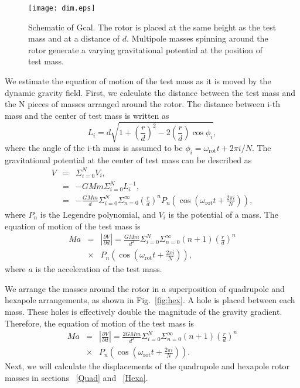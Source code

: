\documentclass[%
 reprint,
superscriptaddress,
 amsmath,amssymb,
 aps,
]{revtex4-1}
\begin{document}
\begin{figure}
\begin{center}
\texttt{[image: dim.eps]}
\caption{Schematic of Gcal. The rotor is placed at  the same height as the test mass and at a distance of $d$. Multipole masses spinning around the rotor generate a varying gravitational potential at the position of test mass.}
\label{fig:dim}
\end{center}
\end{figure}
We estimate the equation of motion of the test mass as it is moved by the dynamic gravity field.
First, we calculate the distance between the test mass and the N pieces of masses arranged around the rotor.
The distance between i-th mass and the center of test mass is written as
\begin{equation}
L_i=d \sqrt{1+\left( \frac{r}{d} \right)^2 -2\left( \frac{r}{d} \right) \cos{\phi_i} },
\end{equation}
where the angle of the i-th mass is assumed to be $\phi_i=\omega_{\mathrm{rot}} t + 2\pi i/N$.
The gravitational potential at the center of test mass can be described as
\begin{eqnarray}
V &=& \Sigma^N_{i=0} V_i, \\
&=& -GMm \Sigma^N_{i=0}L_i^{-1},\\ \label{eq:vpot}
&=&-\frac{G\!M\!m\!}{d} \Sigma^N_{i=0} \Sigma^{\infty}_{n=0}\! \left(\! \frac{r}{d}\! \right)^n
\!P_n\! \left(\! \cos{\!\left( \! \omega_{\mathrm{rot}} t \!+\!\frac{2 \pi i}{N}\right)\!}\right),
\end{eqnarray}
where $P_n$ is the Legendre polynomial, and $V_i$ is the potential of a mass. The equation of motion of the test mass is 
\begin{eqnarray}
Ma&=&\left| \frac{\partial V}{\partial{d}} \right| =\frac{GMm}{d^2}\Sigma^N_{i=0} \Sigma^{\infty}_{n=0}(n+1) \left( \frac{r}{d} \right)^n \nonumber \\
&\times& P_n\left(\cos{\left(\omega_{\mathrm{rot}} t +\frac{2 \pi i}{N}\right)}\right),
\end{eqnarray}
where $a$ is the acceleration of the test mass. 

We arrange the masses around the rotor in a superposition of quadrupole and hexapole arrangements, as shown in Fig.~\ref{fig:hex}. A hole is placed between each mass. These holes is effectively double the magnitude of the gravity gradient. Therefore, the equation of motion of the test mass is 
\begin{eqnarray}
Ma&=&\left| \frac{\partial V}{\partial{d}} \right| =\frac{2GMm}{d^2}\Sigma^N_{i=0} \Sigma^{\infty}_{n=0}(n+1) \left( \frac{r}{d} \right)^n \nonumber \\
&\times& P_n\left(\cos{\left(\omega_{\mathrm{rot}} t +\frac{2 \pi i}{N}\right)}\right). \label{eq:EOM}
\end{eqnarray}
Next, we will calculate the displacements of the quadrupole and hexapole rotor masses in sections ~\ref{Quad}  and ~\ref{Hexa}.
\end{document}
